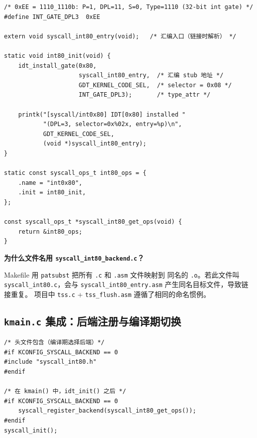 \begin{lstlisting}[style=cstyle]
/* 0xEE = 1110_1110b: P=1, DPL=11, S=0, Type=1110 (32-bit int gate) */
#define INT_GATE_DPL3  0xEE

extern void syscall_int80_entry(void);   /* 汇编入口（链接时解析） */

static void int80_init(void) {
    idt_install_gate(0x80,
                     syscall_int80_entry,  /* 汇编 stub 地址 */
                     GDT_KERNEL_CODE_SEL,  /* selector = 0x08 */
                     INT_GATE_DPL3);       /* type_attr */

    printk("[syscall/int0x80] IDT[0x80] installed "
           "(DPL=3, selector=0x%02x, entry=%p)\n",
           GDT_KERNEL_CODE_SEL,
           (void *)syscall_int80_entry);
}

static const syscall_ops_t int80_ops = {
    .name = "int0x80",
    .init = int80_init,
};

const syscall_ops_t *syscall_int80_get_ops(void) {
    return &int80_ops;
}
\end{lstlisting}

\begin{whybox}
\textbf{为什么文件名用 \texttt{syscall\_int80\_backend.c}？}

Makefile 用 \texttt{patsubst} 把所有 \texttt{.c} 和 \texttt{.asm} 文件映射到
同名的 \texttt{.o}。若此文件叫 \texttt{syscall\_int80.c}，会与
\texttt{syscall\_int80\_entry.asm} 产生同名目标文件，导致链接重复。
项目中 \texttt{tss.c} + \texttt{tss\_flush.asm} 遵循了相同的命名惯例。
\end{whybox}

\subsection{\texttt{kmain.c} 集成：后端注册与编译期切换}
\label{sec:int80-kmain}

\begin{lstlisting}[style=cstyle]
/* 头文件包含（编译期选择后端）*/
#if KCONFIG_SYSCALL_BACKEND == 0
#include "syscall_int80.h"
#endif

/* 在 kmain() 中，idt_init() 之后 */
#if KCONFIG_SYSCALL_BACKEND == 0
    syscall_register_backend(syscall_int80_get_ops());
#endif
syscall_init();
\end{lstlisting}

